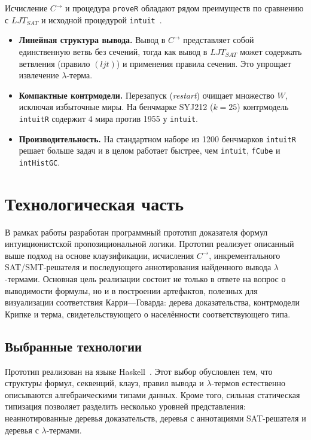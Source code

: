 \documentclass[14pt, russian]{scrartcl}
\begin{document}
Исчисление $C^{\rightarrow}$ и процедура \texttt{proveR} обладают рядом
преимуществ по сравнению с $LJT_{SAT}$ и исходной процедурой
\texttt{intuit}~\cite{ClaessenRosen2015}.

\begin{itemize}
\item \textbf{Линейная структура вывода.} Вывод в $C^{\rightarrow}$
  представляет собой единственную ветвь без сечений, тогда как вывод в
  $LJT_{SAT}$ может содержать ветвления (правило $(ljt)$) и применения правила
  сечения. Это упрощает извлечение $\lambda$-терма.
\item \textbf{Компактные контрмодели.} Перезапуск (\emph{restart}) очищает
  множество $W$, исключая избыточные миры. На бенчмарке SYJ212 ($k = 25$)
  контрмодель \texttt{intuitR} содержит 4 мира против 1955 у \texttt{intuit}.
\item \textbf{Производительность.} На стандартном наборе из 1200 бенчмарков
  \texttt{intuitR} решает больше задач и в целом работает быстрее, чем
  \texttt{intuit}, \texttt{fCube} и \texttt{intHistGC}.
\end{itemize}

\section{Технологическая часть}

В рамках работы разработан программный прототип доказателя формул
интуиционистской пропозициональной логики. Прототип реализует описанный выше
подход на основе клаузификации, исчисления $C^{\rightarrow}$, инкрементального
SAT/SMT-решателя и последующего аннотирования найденного вывода
$\lambda$-термами. Основная цель реализации состоит не только в ответе на
вопрос о выводимости формулы, но и в построении артефактов, полезных для
визуализации соответствия Карри---Говарда: дерева доказательства, контрмодели
Крипке и терма, свидетельствующего о населённости соответствующего типа.

\subsection{Выбранные технологии}

Прототип реализован на языке Haskell~\cite{HaskellReport2010,GHCUserGuide}. Этот
выбор обусловлен тем, что структуры формул, секвенций, клауз, правил вывода и
$\lambda$-термов естественно описываются алгебраическими типами данных. Кроме
того, сильная статическая типизация позволяет разделить несколько уровней
представления: неаннотированные деревья доказательств, деревья с аннотациями
SAT-решателя и деревья с $\lambda$-термами.
\end{document}
